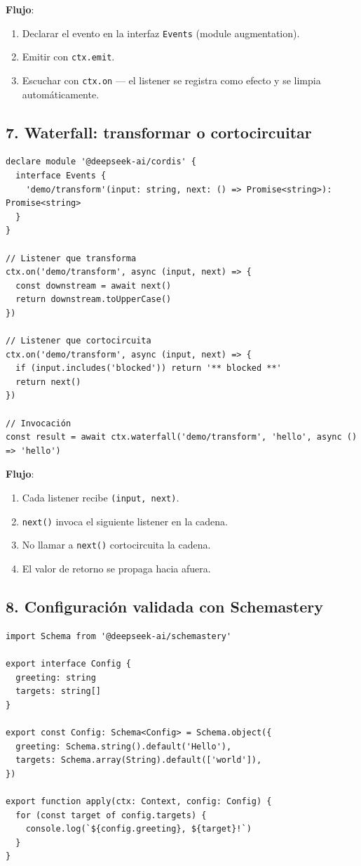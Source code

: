 \documentclass[11pt,a4paper]{article}
\begin{document}
\textbf{Flujo}:


\begin{enumerate}[leftmargin=*,topsep=2pt,itemsep=1pt]
  \item Declarar el evento en la interfaz \texttt{Events} (module augmentation).
  \item Emitir con \texttt{ctx.emit}.
  \item Escuchar con \texttt{ctx.on} — el listener se registra como efecto y se limpia automáticamente.
\end{enumerate}


\subsection*{7. Waterfall: transformar o cortocircuitar}


\begin{lstlisting}
declare module '@deepseek-ai/cordis' {
  interface Events {
    'demo/transform'(input: string, next: () => Promise<string>): Promise<string>
  }
}

// Listener que transforma
ctx.on('demo/transform', async (input, next) => {
  const downstream = await next()
  return downstream.toUpperCase()
})

// Listener que cortocircuita
ctx.on('demo/transform', async (input, next) => {
  if (input.includes('blocked')) return '** blocked **'
  return next()
})

// Invocación
const result = await ctx.waterfall('demo/transform', 'hello', async () => 'hello')
\end{lstlisting}


\textbf{Flujo}:


\begin{enumerate}[leftmargin=*,topsep=2pt,itemsep=1pt]
  \item Cada listener recibe \texttt{(input, next)}.
  \item \texttt{next()} invoca el siguiente listener en la cadena.
  \item No llamar a \texttt{next()} cortocircuita la cadena.
  \item El valor de retorno se propaga hacia afuera.
\end{enumerate}


\subsection*{8. Configuración validada con Schemastery}


\begin{lstlisting}
import Schema from '@deepseek-ai/schemastery'

export interface Config {
  greeting: string
  targets: string[]
}

export const Config: Schema<Config> = Schema.object({
  greeting: Schema.string().default('Hello'),
  targets: Schema.array(String).default(['world']),
})

export function apply(ctx: Context, config: Config) {
  for (const target of config.targets) {
    console.log(`${config.greeting}, ${target}!`)
  }
}
\end{lstlisting}
\end{document}

